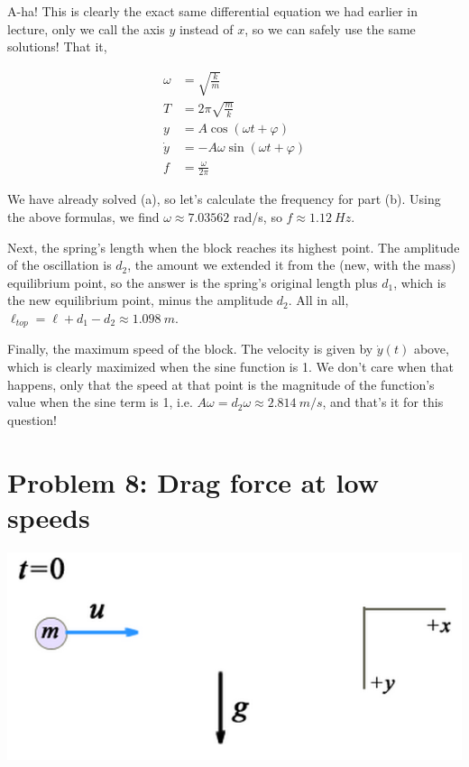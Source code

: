 \documentclass[8.01x]{subfiles}
\begin{document}
A-ha! This is clearly the exact same differential equation we had earlier in lecture, only we call the axis $y$ instead of $x$, so we can safely use the same solutions! That it,

\begin{align}
\omega &= \sqrt{\frac{k}{m}}\\
T &= 2 \pi \sqrt{\frac{m}{k}}\\
y &= A \cos (\omega t + \varphi)\\
\dot{y} &= -A \omega \sin(\omega t + \varphi)\\
f &= \frac{\omega}{2\pi}
\end{align}

We have already solved (a), so let's calculate the frequency for part (b). Using the above formulas, we find $\omega \approx 7.03562$ rad/s, so $f \approx \SI{1.12}{Hz}$.

Next, the spring's length when the block reaches its highest point. The amplitude of the oscillation is $d_2$, the amount we extended it from the (new, with the mass) equilibrium point, so the answer is the spring's original length plus $d_1$, which is the new equilibrium point, minus the amplitude $d_2$. All in all, $\ell_{top} = \ell + d_1 - d_2 \approx \SI{1.098}{m}$.

Finally, the maximum speed of the block. The velocity is given by $\dot{y}(t)$ above, which is clearly maximized when the sine function is 1. We don't care when that happens, only that the speed at that point is the magnitude of the function's value when the sine term is 1, i.e. $A \omega = d_2 \omega \approx \SI{2.814}{m/s}$, and that's it for this question!

\section{Problem 8: Drag force at low speeds}

\begin{center}
\includegraphics[scale=0.6]{Graphics/h4p8}
\end{center}
\end{document}
